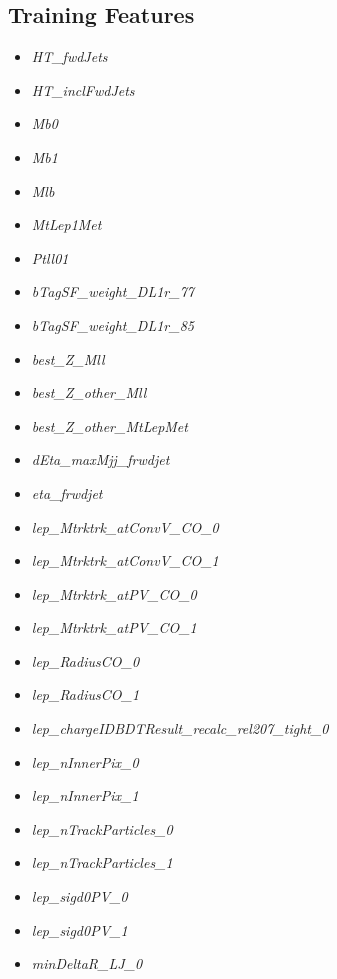 \subsection{Training Features}\label{trainMissingFeatures}
    \begin{multicols}{2}
    \begin{itemize}
        \item \textit{HT\_fwdJets}
        \item \textit{HT\_inclFwdJets}
        \item \textit{Mb0}
        \item \textit{Mb1}
        \item \textit{Mlb}
        \item \textit{MtLep1Met}
        \item \textit{Ptll01}
        \item \textit{bTagSF\_weight\_DL1r\_77}
        \item \textit{bTagSF\_weight\_DL1r\_85}
        \item \textit{best\_Z\_Mll}
        \item \textit{best\_Z\_other\_Mll}
        \item \textit{best\_Z\_other\_MtLepMet}
        \item \textit{dEta\_maxMjj\_frwdjet}
        \item \textit{eta\_frwdjet}
        \item \textit{lep\_Mtrktrk\_atConvV\_CO\_0}
        \item \textit{lep\_Mtrktrk\_atConvV\_CO\_1}
        \item \textit{lep\_Mtrktrk\_atPV\_CO\_0}
        \item \textit{lep\_Mtrktrk\_atPV\_CO\_1}
        \item \textit{lep\_RadiusCO\_0}
        \item \textit{lep\_RadiusCO\_1}
        \item \textit{lep\_chargeIDBDTResult\_recalc\_rel207\_tight\_0}
        \item \textit{lep\_nInnerPix\_0}
        \item \textit{lep\_nInnerPix\_1}
        \item \textit{lep\_nTrackParticles\_0}
        \item \textit{lep\_nTrackParticles\_1}
        \item \textit{lep\_sigd0PV\_0}
        \item \textit{lep\_sigd0PV\_1}
        \item \textit{minDeltaR\_LJ\_0}

\end{itemize}
\end{multicols}
